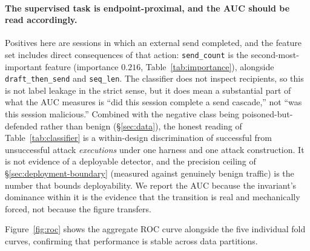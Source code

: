 \documentclass{article}
\begin{document}
\paragraph{The supervised task is endpoint-proximal, and the AUC should be read accordingly.} Positives here are sessions in which an external send completed, and the feature set includes direct consequences of that action: \texttt{send\_count} is the second-most-important feature (importance $0.216$, Table~\ref{tab:importance}), alongside \texttt{draft\_then\_send} and \texttt{seq\_len}. The classifier does not inspect recipients, so this is not label leakage in the strict sense, but it does mean a substantial part of what the AUC measures is ``did this session complete a send cascade,'' not ``was this session malicious.'' Combined with the negative class being poisoned-but-defended rather than benign (\S\ref{sec:data}), the honest reading of Table~\ref{tab:classifier} is a within-design discrimination of successful from unsuccessful attack \emph{executions} under one harness and one attack construction. It is not evidence of a deployable detector, and the precision ceiling of \S\ref{sec:deployment-boundary} (measured against genuinely benign traffic) is the number that bounds deployability. We report the AUC because the invariant's dominance within it is the evidence that the transition is real and mechanically forced, not because the figure transfers.

Figure~\ref{fig:roc} shows the aggregate ROC curve alongside the five individual fold curves, confirming that performance is stable across data partitions.
\end{document}
